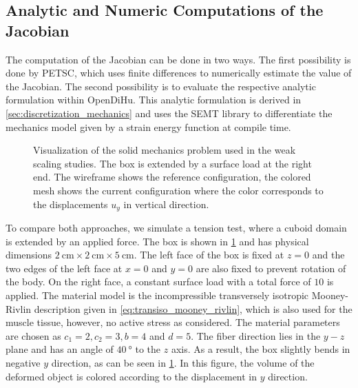 \subsection{Analytic and Numeric Computations of the Jacobian}\label{sec:analytic_numeric_jacobian}

The computation of the Jacobian can be done in two ways. The first possibility is done by PETSC, which uses finite differences to numerically estimate the value of the Jacobian. The second possibility is to evaluate the respective analytic formulation within OpenDiHu. This analytic formulation is derived in \cref{sec:discretization_mechanics} and uses the SEMT library \cite{semt} to differentiate the mechanics model given by a strain energy function at compile time.

\begin{figure}
  \centering%
  \def\svgwidth{0.6\textwidth}
  \caption{Visualization of the solid mechanics problem used in the weak scaling studies. The box is extended by a surface load at the right end. The wireframe shows the reference configuration, the colored mesh shows the current configuration where the color corresponds to the displacements $u_y$ in vertical direction.}%
  \label{fig:mechanic_scenario}%
\end{figure}

To compare both approaches, we simulate a tension test, where a cuboid domain is extended by an applied force. 
The box is shown in \cref{fig:mechanic_scenario} and has physical dimensions $\SI{2}{\cm} \times \SI{2}{\cm} \times \SI{5}{\cm}$. The left face of the box is fixed at $z=0$ and the two edges of the left face at $x=0$ and $y=0$ are also fixed to prevent rotation of the body. On the right face, a constant surface load with a total force of $10$ is applied.
The material model is the incompressible transversely isotropic Mooney-Rivlin description given in \cref{eq:transiso_mooney_rivlin}, which is also used for the muscle tissue, however, no active stress as considered. The material parameters are chosen as $c_1=2, c_2=3, b = 4$ and $d = 5$. The fiber direction lies in the $y-z$ plane and has an angle of $\SI{40}{\degree}$ to the $z$ axis.
As a result, the box slightly bends in negative $y$ direction, as can be seen in \cref{fig:mechanic_scenario}. In this figure, the volume of the deformed object is colored according to the displacement in $y$ direction.

